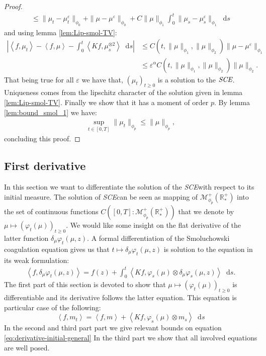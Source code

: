 \documentclass[11pt,a4paper]{article}
\newcommand{\RRP}{\mathbb{R}^+_*}
\newcommand{\MC}{\mathcal{M}}
\newcommand{\SCE}{\emph{SCE}}
\newcommand{\Proc}[1]{\left(#1\right)_{t\geq 0}}
\newcommand{\brac}[1]{\left\langle#1\right\rangle}
\newcommand{\dd}{\mathop{}\!\mathrm{d}}
\begin{document}
\begin{proof}
\begin{multline*}
        \leq \|\mu_t - \mu_t^\varepsilon\|_{\phi_0} + \|\mu - \mu^\varepsilon\|_{\phi_0} + C\|\mu\|_{\phi_1}\int_0^t \| \mu_s - \mu^\varepsilon_s \|_{\phi_1} \dd s
    \end{multline*}
    and using lemma \ref{lem:Lip-smol-TV}:
    \begin{align*}
        \left|\brac{f,\mu_t} - \brac{f,\mu} - \int_0^t\brac{Kf,\mu_s^{\otimes 2}}\dd s\right| &\leq C(t,\|\mu\|_{\phi_1},\|\mu\|_{\phi_2})\|\mu - \mu^\varepsilon\|_{\phi_1} \\
        &\leq \varepsilon^{\alpha} C(t,\|\mu\|_{\phi_1},\|\mu\|_{\phi_2})\|\mu\|_{\phi_2}.
    \end{align*}
    That being true for all $\varepsilon$ we have that, $\Proc{\mu_t}$ is a solution to the $\SCE$. Uniqueness comes from the lipschitz character of the solution given in lemma \ref{lem:Lip-smol-TV}. Finally we show that it has a moment of order $p$. By lemma \ref{lem:bound_smol_1} we have:
    \begin{align*}
        \sup\limits_{t \in [0,T]} \| \mu_t\|_{\phi_{p}} \leq  \| \mu\|_{\phi_{p}},
    \end{align*}
    concluding this proof.
\end{proof}

\subsection{First derivative}
In this section we want to differentiate the solution of the \SCE with respect to its initial measure. The solution of \SCE can be seen as mapping of $\MC^+_{\phi_p}\left(\RRP \right)$ into the set of continuous functions $C\left([0,T]:\MC^+_{\phi_p}\left(\RRP \right)\right)$ that we denote by $\mu \mapsto \Proc{\varphi_t(\mu)}$. We would like some insight on the flat derivative of the latter function $\delta_\mu \varphi_t(\mu,z)$. A formal differentiation of the Smoluchowski coagulation equation gives us that $t \mapsto \delta_\mu \varphi_t(\mu,z)$ is solution to the equation in its weak formulation:
\begin{align*}
    \brac{f,\delta_\mu \varphi_t(\mu,z)} = f(z) + \int_0^t \brac{Kf,\varphi_s(\mu)\otimes \delta_\mu \varphi_s(\mu,z)}\dd s.
\end{align*}
The first part of this section is devoted to show that $\mu \mapsto \Proc{\varphi_t(\mu)}$ is differentiable and its derivative follows the latter equation. This equation is particular case of the following: 
\begin{equation}\label{eq:derivative-initial-general}
    \brac{f,m_t} = \brac{f,m} + \brac{Kf,\varphi_s(\mu)\otimes m_s}\dd s
\end{equation}
In the second and third part part we give relevant bounds on equation \ref{eq:derivative-initial-general} In the third part we show that all involved equations are well posed.
\end{document}
